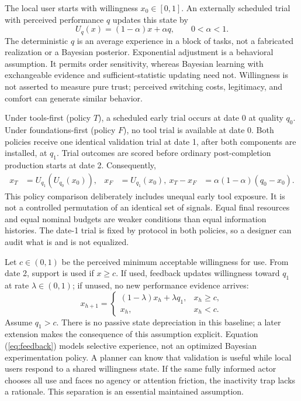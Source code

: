 \documentclass[11pt]{article}
\begin{document}
The local user starts with willingness $x_0\in[0,1]$. An externally scheduled trial with perceived performance $q$ updates this state by
\begin{equation}
 U_q(x)=(1-\alpha)x+\alpha q,\qquad 0<\alpha<1.\label{eq:update}
\end{equation}
The deterministic $q$ is an average experience in a block of tasks, not a fabricated realization or a Bayesian posterior. Exponential adjustment is a behavioral assumption. It permits order sensitivity, whereas Bayesian learning with exchangeable evidence and sufficient-statistic updating need not. Willingness is not asserted to measure pure trust; perceived switching costs, legitimacy, and comfort can generate similar behavior.

Under tools-first (policy $T$), a scheduled early trial occurs at date 0 at quality $q_0$. Under foundations-first (policy $F$), no tool trial is available at date 0. Both policies receive one identical validation trial at date 1, after both components are installed, at $q_1$. Trial outcomes are scored before ordinary post-completion production starts at date 2. Consequently,
\begin{align}
 x_T&=U_{q_1}(U_{q_0}(x_0)),&x_F&=U_{q_1}(x_0),\
 x_T-x_F&=\alpha(1-\alpha)(q_0-x_0).\label{eq:gap}
\end{align}
This policy comparison deliberately includes unequal early tool exposure. It is not a controlled permutation of an identical set of signals. Equal final resources and equal nominal budgets are weaker conditions than equal information histories. The date-1 trial is fixed by protocol in both policies, so a designer can audit what is and is not equalized.

Let $c\in(0,1)$ be the perceived minimum acceptable willingness for use. From date 2, support is used if $x\geq c$. If used, feedback updates willingness toward $q_1$ at rate $\lambda\in(0,1)$; if unused, no new performance evidence arrives:
\begin{equation}
 x_{h+1}=\begin{cases}(1-\lambda)x_h+\lambda q_1,&x_h\geq c,\\x_h,&x_h<c.\end{cases}\label{eq:feedback}
\end{equation}
Assume $q_1>c$. There is no passive state depreciation in this baseline; a later extension makes the consequence of this assumption explicit. Equation (\ref{eq:feedback}) models selective experience, not an optimized Bayesian experimentation policy. A planner can know that validation is useful while local users respond to a shared willingness state. If the same fully informed actor chooses all use and faces no agency or attention friction, the inactivity trap lacks a rationale. This separation is an essential maintained assumption.
\end{document}
